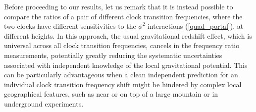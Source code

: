 \documentclass[aps,prd,onecolumn,nofootinbib]{revtex4-2} %
\begin{document}
Before proceeding to our results, let us remark that it is instead possible to compare the ratios of a pair of different clock transition frequencies, where the two clocks have different sensitivities to the $\phi^2$ interactions (\ref{quad_portal}), at different heights. 
In this approach, the usual gravitational redshift effect, which is universal across all clock transition frequencies, cancels in the frequency ratio measurements, potentially greatly reducing the systematic uncertainties associated with independent knowledge of the local gravitational potential. 
This can be particularly advantageous when a clean independent prediction for an individual clock transition frequency shift might be hindered by complex local geographical features, such as near or on top of a large mountain or in underground experiments. 


\end{document}
